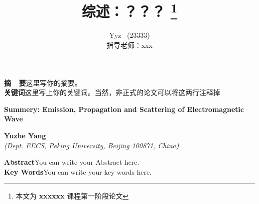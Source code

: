 \documentclass[a4paper,11pt,onecolumn,twoside]{article}
\title{\huge{综述：？？？}
\thanks{本文为 \textbf{xxxxxx} 课程第一阶段论文}}
\author{Yyz \ \small{(23333)}\\[2pt]
\normalsize
指导老师：xxx
\\[2pt]}
\date{}  %
\begin{document}
\newcommand{\supercite}[1]{\textsuperscript{\cite{#1}}}

\maketitle



\setlength{\oddsidemargin}{ 1cm}  %
\setlength{\evensidemargin}{\oddsidemargin}
\setlength{\textwidth}{13.50cm}
\vspace{-.8cm}

\begin{center}
\parbox{\textwidth}{
\textbf{摘\ \ 要}\quad  这里写你的摘要。\\
\textbf{关键词}\quad  这里写上你的关键词。当然，非正式的论文可以将这两行注释掉}
\end{center}



\vspace{.1cm}
\begin{center}
\parbox{\textwidth}{
{\large{\textbf{Summery: Emission, Propagation and Scattering of Electromagnetic Wave}}}\\
\vspace{-0.5cm}
\begin{center}
\textbf{Yuzhe Yang}\\[2pt]
\small{\textit{(Dept. EECS, Peking University, Beijing 100871, China)}}\\[2pt]
\end{center}
{\small{\textbf{Abstract}\quad You can write your Abstract here. \\
\textbf{Key Words}\quad You can write your key words here.}}
}
\end{center}


\setlength{\oddsidemargin}{-.5cm}  %
\setlength{\evensidemargin}{\oddsidemargin}
\setlength{\textwidth}{17.00cm}
\end{document}

